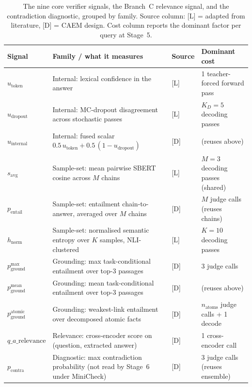 \begin{table}[tbp]
\centering
\caption{The nine core verifier signals, the Branch~C relevance signal, and the contradiction diagnostic, grouped by family. Source column: [L] = adapted from literature, [D] = CAEM design. Cost column reports the dominant factor per query at Stage~5.}
\label{tab:verifier-signals}
\small
\begin{tabular}{@{}p{2.4cm}p{5.2cm}p{1.3cm}p{4.4cm}@{}}
\toprule
\textbf{Signal} & \textbf{Family / what it measures} & \textbf{Source} & \textbf{Dominant cost} \\
\midrule
$u_{\text{token}}$ & Internal: lexical confidence in the answer & [L] & 1 teacher-forced forward pass \\
$u_{\text{dropout}}$ & Internal: MC-dropout disagreement across stochastic passes & [L] & $K_{D} = 5$ decoding passes \\
$u_{\text{internal}}$ & Internal: fused scalar $0.5\,u_{\text{token}} + 0.5\,(1 - u_{\text{dropout}})$ & [D] & (reuses above) \\
\addlinespace[2pt]
$s_{\text{avg}}$ & Sample-set: mean pairwise SBERT cosine across $M$ chains & [L] & $M = 3$ decoding passes (shared) \\
$p_{\text{entail}}$ & Sample-set: entailment chain-to-answer, averaged over $M$ chains & [D] & $M$ judge calls (reuses chains) \\
$h_{\text{norm}}$ & Sample-set: normalised semantic entropy over $K$ samples, NLI-clustered & [L] & $K = 10$ decoding passes \\
\addlinespace[2pt]
$p_{\text{ground}}^{\max}$ & Grounding: max task-conditional entailment over top-3 passages & [D] & 3 judge calls \\
$p_{\text{ground}}^{\text{mean}}$ & Grounding: mean task-conditional entailment over top-3 passages & [D] & (reuses above) \\
$p_{\text{ground}}^{\text{atomic}}$ & Grounding: weakest-link entailment over decomposed atomic facts & [D] & $n_{\text{atoms}}$ judge calls + 1 decode \\
\addlinespace[2pt]
$q\_a\_\text{relevance}$ & Relevance: cross-encoder score on (question, extracted answer) & [D] & 1 cross-encoder call \\
\addlinespace[2pt]
$p_{\text{contra}}$ & Diagnostic: max contradiction probability (not read by Stage~6 under MiniCheck) & [D] & 3 judge calls (reuses ensemble) \\
\bottomrule
\end{tabular}
\end{table}

